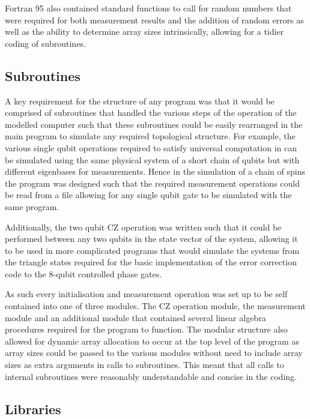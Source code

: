 Fortran 95 also contained standard functions to call for random numbers that were required for both measurement results and the addition of random errors as well as the ability to determine array sizes intrinsically, allowing for a tidier coding of subroutines.


\subsection{Subroutines}

A key requirement for the structure of any program was that it would be comprised of subroutines that handled the various steps of the operation of the modelled computer such that these subroutines could be easily rearranged in the main program to simulate any required topological structure. For example, the various single qubit operations required to satisfy universal computation in \citep{raussendorf_measurement-based_2003} can be simulated using the same physical system of a short chain of qubits but with different eigenbases for measurements. Hence in the simulation of a chain of spins the program was designed such that the required measurement operations could be read from a file allowing for any single qubit gate to be simulated with the same program.

Additionally, the two qubit CZ operation was written such that it could be performed between any two qubits in the state vector of the system, allowing it to be used in more complicated programs that would simulate the systems from the triangle states required for the basic implementation of the error correction code to the 8-qubit controlled phase gates.

As such every initialisation and measurement operation was set up to be self contained into one of three modules. The CZ operation module, the measurement module and an additional module that contained several linear algebra procedures required for the program to function. The modular structure also allowed for dynamic array allocation to occur at the top level of the program as array sizes could be passed to the various modules without need to include array sizes as extra arguments in calls to subroutines. This meant that all calls to internal subroutines were reasonably understandable and concise in the coding.


\subsection{Libraries}

